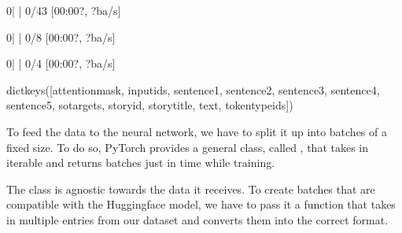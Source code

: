 \documentclass[letterpaper,10pt,english]{jupyterBook}
\begin{document}
\begin{sphinxVerbatimOutput}

\begin{sphinxVerbatim}[commandchars=\\\{\}]
  0\PYGZpc{}|          | 0/43 [00:00\PYGZlt{}?, ?ba/s]
\end{sphinxVerbatim}

\begin{sphinxVerbatim}[commandchars=\\\{\}]
  0\PYGZpc{}|          | 0/8 [00:00\PYGZlt{}?, ?ba/s]
\end{sphinxVerbatim}

\begin{sphinxVerbatim}[commandchars=\\\{\}]
  0\PYGZpc{}|          | 0/4 [00:00\PYGZlt{}?, ?ba/s]
\end{sphinxVerbatim}

\begin{sphinxVerbatim}[commandchars=\\\{\}]
dict\PYGZus{}keys([\PYGZsq{}attention\PYGZus{}mask\PYGZsq{}, \PYGZsq{}input\PYGZus{}ids\PYGZsq{}, \PYGZsq{}sentence1\PYGZsq{}, \PYGZsq{}sentence2\PYGZsq{}, \PYGZsq{}sentence3\PYGZsq{}, \PYGZsq{}sentence4\PYGZsq{}, \PYGZsq{}sentence5\PYGZsq{}, \PYGZsq{}so\PYGZus{}targets\PYGZsq{}, \PYGZsq{}storyid\PYGZsq{}, \PYGZsq{}storytitle\PYGZsq{}, \PYGZsq{}text\PYGZsq{}, \PYGZsq{}token\PYGZus{}type\PYGZus{}ids\PYGZsq{}])
\end{sphinxVerbatim}
\end{sphinxVerbatimOutput}

\sphinxAtStartPar
To feed the data to the neural network, we have to split it up into batches of a fixed size.
To do so, PyTorch provides a general class, called , that takes in iterable and returns batches just in time while training.

\sphinxAtStartPar
The  class is agnostic towards the data it receives. To create batches that are compatible with the Huggingface model, we have to pass it a function that takes in multiple entries from our dataset and converts them into the correct format.
\end{document}
